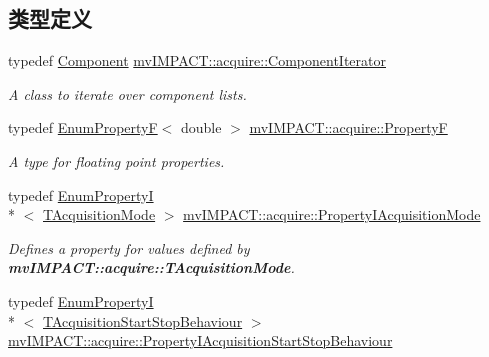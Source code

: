 \subsection*{类型定义}
\begin{DoxyCompactItemize}
\item 
typedef \hyperlink{classmv_i_m_p_a_c_t_1_1acquire_1_1_component}{Component} \hyperlink{group___common_interface_ga461a5ba2197d9e599ee35e2514d684ef}{mv\+I\+M\+P\+A\+C\+T\+::acquire\+::\+Component\+Iterator}
\begin{DoxyCompactList}\small\item\em A class to iterate over component lists. \end{DoxyCompactList}\item 
typedef \hyperlink{classmv_i_m_p_a_c_t_1_1acquire_1_1_enum_property_f}{Enum\+Property\+F}$<$ double $>$ \hyperlink{group___common_interface_gaf54865fe5a3d5cfd15f9a111b40d09f9}{mv\+I\+M\+P\+A\+C\+T\+::acquire\+::\+Property\+F}
\begin{DoxyCompactList}\small\item\em A type for floating point properties. \end{DoxyCompactList}\item 
\hypertarget{group___common_interface_gadfe0e124b4ab278eb8bb228d3c4ba63b}{typedef \hyperlink{classmv_i_m_p_a_c_t_1_1acquire_1_1_enum_property_i}{Enum\+Property\+I}\\*
$<$ \hyperlink{group___common_interface_ga712e943ac923bb84ce2f83a57b20e6b1}{T\+Acquisition\+Mode} $>$ \hyperlink{group___common_interface_gadfe0e124b4ab278eb8bb228d3c4ba63b}{mv\+I\+M\+P\+A\+C\+T\+::acquire\+::\+Property\+I\+Acquisition\+Mode}}\label{group___common_interface_gadfe0e124b4ab278eb8bb228d3c4ba63b}

\begin{DoxyCompactList}\small\item\em Defines a property for values defined by {\bfseries mv\+I\+M\+P\+A\+C\+T\+::acquire\+::\+T\+Acquisition\+Mode}. \end{DoxyCompactList}\item 
\hypertarget{group___common_interface_ga4b53c0f0c5478e5c079b4c2082c53690}{typedef \hyperlink{classmv_i_m_p_a_c_t_1_1acquire_1_1_enum_property_i}{Enum\+Property\+I}\\*
$<$ \hyperlink{group___common_interface_ga5c60e3239df59a2d82b529ebc7ed13f5}{T\+Acquisition\+Start\+Stop\+Behaviour} $>$ \hyperlink{group___common_interface_ga4b53c0f0c5478e5c079b4c2082c53690}{mv\+I\+M\+P\+A\+C\+T\+::acquire\+::\+Property\+I\+Acquisition\+Start\+Stop\+Behaviour}}\label{group___common_interface_ga4b53c0f0c5478e5c079b4c2082c53690}


\end{DoxyCompactItemize}
